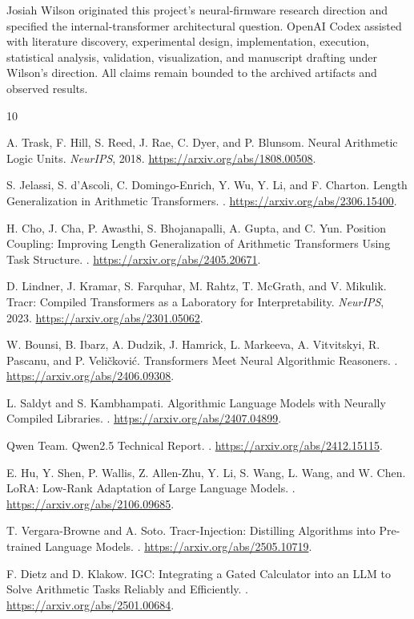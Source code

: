 \documentclass[11pt]{article}
\begin{document}
Josiah Wilson originated this project's neural-firmware research direction and
specified the internal-transformer architectural question. OpenAI Codex
assisted with literature discovery, experimental design, implementation,
execution, statistical analysis, validation, visualization, and manuscript
drafting under Wilson's direction. All claims remain bounded to the archived
artifacts and observed results.

\begin{thebibliography}{10}

A. Trask, F. Hill, S. Reed, J. Rae, C. Dyer, and P. Blunsom.
\newblock Neural Arithmetic Logic Units.
\newblock \emph{NeurIPS}, 2018.
\newblock \url{https://arxiv.org/abs/1808.00508}.

S. Jelassi, S. d'Ascoli, C. Domingo-Enrich, Y. Wu, Y. Li, and F. Charton.
\newblock Length Generalization in Arithmetic Transformers.
.
\newblock \url{https://arxiv.org/abs/2306.15400}.

H. Cho, J. Cha, P. Awasthi, S. Bhojanapalli, A. Gupta, and C. Yun.
\newblock Position Coupling: Improving Length Generalization of Arithmetic
Transformers Using Task Structure.
.
\newblock \url{https://arxiv.org/abs/2405.20671}.

D. Lindner, J. Kramar, S. Farquhar, M. Rahtz, T. McGrath, and V. Mikulik.
\newblock Tracr: Compiled Transformers as a Laboratory for Interpretability.
\newblock \emph{NeurIPS}, 2023.
\newblock \url{https://arxiv.org/abs/2301.05062}.

W. Bounsi, B. Ibarz, A. Dudzik, J. Hamrick, L. Markeeva, A. Vitvitskyi,
R. Pascanu, and P. Veli\v{c}kovi\'{c}.
\newblock Transformers Meet Neural Algorithmic Reasoners.
.
\newblock \url{https://arxiv.org/abs/2406.09308}.

L. Saldyt and S. Kambhampati.
\newblock Algorithmic Language Models with Neurally Compiled Libraries.
.
\newblock \url{https://arxiv.org/abs/2407.04899}.

Qwen Team.
\newblock Qwen2.5 Technical Report.
.
\newblock \url{https://arxiv.org/abs/2412.15115}.

E. Hu, Y. Shen, P. Wallis, Z. Allen-Zhu, Y. Li, S. Wang, L. Wang, and W. Chen.
\newblock LoRA: Low-Rank Adaptation of Large Language Models.
.
\newblock \url{https://arxiv.org/abs/2106.09685}.

T. Vergara-Browne and A. Soto.
\newblock Tracr-Injection: Distilling Algorithms into Pre-trained Language
Models.
.
\newblock \url{https://arxiv.org/abs/2505.10719}.

F. Dietz and D. Klakow.
\newblock IGC: Integrating a Gated Calculator into an LLM to Solve Arithmetic
Tasks Reliably and Efficiently.
.
\newblock \url{https://arxiv.org/abs/2501.00684}.

\end{thebibliography}
\end{document}
